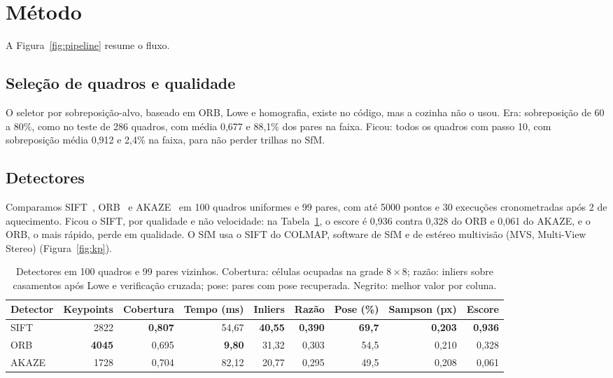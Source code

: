 \section{Método}
\label{sec:metodo}

A Figura~\ref{fig:pipeline} resume o fluxo.

\subsection{Seleção de quadros e qualidade}

O seletor por sobreposição-alvo, baseado em ORB, Lowe e homografia, existe no código, mas a cozinha não o usou. Era: sobreposição de 60 a 80\%, como no teste de 286 quadros, com média 0,677 e 88,1\% dos pares na faixa. Ficou: todos os quadros com passo 10, com sobreposição média 0,912 e 2,4\% na faixa, para não perder trilhas no SfM.

\subsection{Detectores}

Comparamos SIFT~\cite{lowe2004sift}, ORB~\cite{rublee2011orb} e AKAZE~\cite{alcantarilla2013fast} em 100 quadros uniformes e 99 pares, com até 5000 pontos e 30 execuções cronometradas após 2 de aquecimento. Ficou o SIFT, por qualidade e não velocidade: na Tabela~\ref{tab:detectores}, o escore é 0,936 contra 0,328 do ORB e 0,061 do AKAZE, e o ORB, o mais rápido, perde em qualidade. O SfM usa o SIFT do COLMAP, software de SfM e de estéreo multivisão (MVS, Multi-View Stereo) (Figura~\ref{fig:kp}).

\begin{table}[!htbp]
\centering
\scriptsize
\setlength{\tabcolsep}{3pt}
\caption{Detectores em 100 quadros e 99 pares vizinhos. Cobertura: células ocupadas na grade $8\times8$; razão: inliers sobre casamentos após Lowe e verificação cruzada; pose: pares com pose recuperada. Negrito: melhor valor por coluna.}
\label{tab:detectores}
\begin{tabular}{lrrrrrrrr}
\toprule
Detector & Keypoints & Cobertura & Tempo (ms) & Inliers & Razão & Pose (\%) & Sampson (px) & Escore \\
\midrule
SIFT & 2822 & \textbf{0,807} & 54,67 & \textbf{40,55} & \textbf{0,390} & \textbf{69,7} & \textbf{0,203} & \textbf{0,936} \\
ORB & \textbf{4045} & 0,695 & \textbf{9,80} & 31,32 & 0,303 & 54,5 & 0,210 & 0,328 \\
AKAZE & 1728 & 0,704 & 82,12 & 20,77 & 0,295 & 49,5 & 0,208 & 0,061 \\
\bottomrule
\end{tabular}
\end{table}

